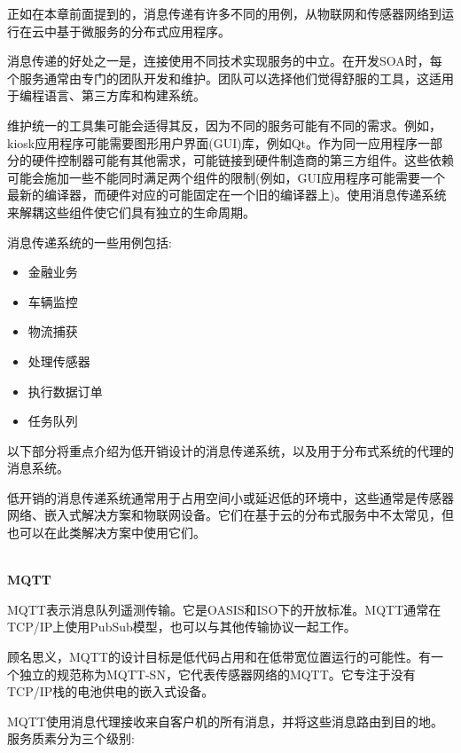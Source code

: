 
正如在本章前面提到的，消息传递有许多不同的用例，从物联网和传感器网络到运行在云中基于微服务的分布式应用程序。

消息传递的好处之一是，连接使用不同技术实现服务的中立。在开发SOA时，每个服务通常由专门的团队开发和维护。团队可以选择他们觉得舒服的工具，这适用于编程语言、第三方库和构建系统。

维护统一的工具集可能会适得其反，因为不同的服务可能有不同的需求。例如，kiosk应用程序可能需要图形用户界面(GUI)库，例如Qt。作为同一应用程序一部分的硬件控制器可能有其他需求，可能链接到硬件制造商的第三方组件。这些依赖可能会施加一些不能同时满足两个组件的限制(例如，GUI应用程序可能需要一个最新的编译器，而硬件对应的可能固定在一个旧的编译器上)。使用消息传递系统来解耦这些组件使它们具有独立的生命周期。

消息传递系统的一些用例包括:

\begin{itemize}
\item 
金融业务

\item 
车辆监控

\item 
物流捕获

\item 
处理传感器

\item 
执行数据订单

\item 
任务队列
\end{itemize}

以下部分将重点介绍为低开销设计的消息传递系统，以及用于分布式系统的代理的消息系统。


低开销的消息传递系统通常用于占用空间小或延迟低的环境中，这些通常是传感器网络、嵌入式解决方案和物联网设备。它们在基于云的分布式服务中不太常见，但也可以在此类解决方案中使用它们。

\hspace*{\fill} \\ %
\noindent
\textbf{MQTT}

MQTT表示消息队列遥测传输。它是OASIS和ISO下的开放标准。MQTT通常在TCP/IP上使用PubSub模型，也可以与其他传输协议一起工作。

顾名思义，MQTT的设计目标是低代码占用和在低带宽位置运行的可能性。有一个独立的规范称为MQTT-SN，它代表传感器网络的MQTT。它专注于没有TCP/IP栈的电池供电的嵌入式设备。

MQTT使用消息代理接收来自客户机的所有消息，并将这些消息路由到目的地。服务质素分为三个级别:

